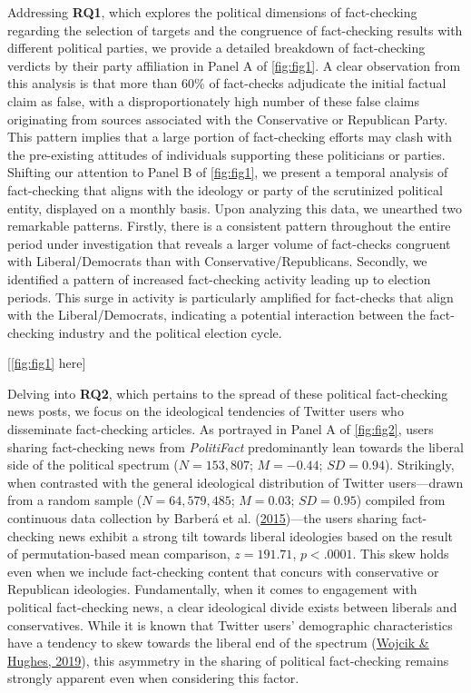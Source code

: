 \documentclass[
  12pt,
]{article}
\begin{document}
Addressing \textbf{RQ1}, which explores the political dimensions of
fact-checking regarding the selection of targets and the congruence of
fact-checking results with different political parties, we provide a
detailed breakdown of fact-checking verdicts by their party affiliation
in Panel A of \autoref{fig:fig1}. A clear observation from this analysis
is that more than 60\% of fact-checks adjudicate the initial factual
claim as false, with a disproportionately high number of these false
claims originating from sources associated with the Conservative or
Republican Party. This pattern implies that a large portion of
fact-checking efforts may clash with the pre-existing attitudes of
individuals supporting these politicians or parties. Shifting our
attention to Panel B of \autoref{fig:fig1}, we present a temporal
analysis of fact-checking that aligns with the ideology or party of the
scrutinized political entity, displayed on a monthly basis. Upon
analyzing this data, we unearthed two remarkable patterns. Firstly,
there is a consistent pattern throughout the entire period under
investigation that reveals a larger volume of fact-checks congruent with
Liberal/Democrats than with Conservative/Republicans. Secondly, we
identified a pattern of increased fact-checking activity leading up to
election periods. This surge in activity is particularly amplified for
fact-checks that align with the Liberal/Democrats, indicating a
potential interaction between the fact-checking industry and the
political election cycle.

\begin{center}
[\autoref{fig:fig1} here]
\end{center}

Delving into \textbf{RQ2}, which pertains to the spread of these
political fact-checking news posts, we focus on the ideological
tendencies of Twitter users who disseminate fact-checking articles. As
portrayed in Panel A of \autoref{fig:fig2}, users sharing fact-checking
news from \emph{PolitiFact} predominantly lean towards the liberal side
of the political spectrum (\(N = 153,807\); \(M = -0.44\);
\(SD = 0.94\)). Strikingly, when contrasted with the general ideological
distribution of Twitter users---drawn from a random sample
(\(N = 64,579,485\); \(M = 0.03\); \(SD = 0.95\)) compiled from
continuous data collection by Barberá et al.
(\protect\hyperlink{ref-barbera2015tweeting}{2015})---the users sharing
fact-checking news exhibit a strong tilt towards liberal ideologies
based on the result of permutation-based mean comparison,
\(z = 191.71\), \(p < .0001\). This skew holds even when we include
fact-checking content that concurs with conservative or Republican
ideologies. Fundamentally, when it comes to engagement with political
fact-checking news, a clear ideological divide exists between liberals
and conservatives. While it is known that Twitter users' demographic
characteristics have a tendency to skew towards the liberal end of the
spectrum (\protect\hyperlink{ref-wojcik2019sizing}{Wojcik \& Hughes,
2019}), this asymmetry in the sharing of political fact-checking remains
strongly apparent even when considering this factor.
\end{document}
